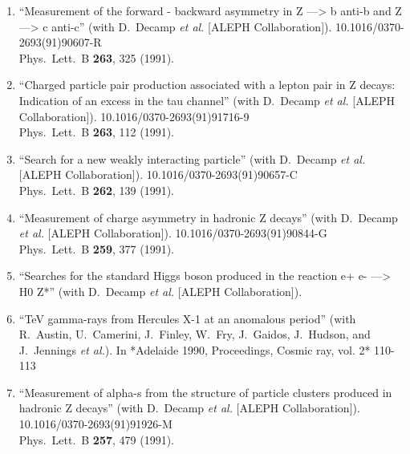 \begin{enumerate}
\item ``Measurement of the forward - backward asymmetry in Z ---> b anti-b and Z ---> c anti-c'' (with D.~Decamp {\it et al.}  [ALEPH Collaboration]). 10.1016/0370-2693(91)90607-R
\\{}Phys.\ Lett.\ B {\bf 263}, 325 (1991). %


\item ``Charged particle pair production associated with a lepton pair in Z decays: Indication of an excess in the tau channel'' (with D.~Decamp {\it et al.}  [ALEPH Collaboration]). 10.1016/0370-2693(91)91716-9
\\{}Phys.\ Lett.\ B {\bf 263}, 112 (1991). %


\item ``Search for a new weakly interacting particle'' (with D.~Decamp {\it et al.}  [ALEPH Collaboration]). 10.1016/0370-2693(91)90657-C
\\{}Phys.\ Lett.\ B {\bf 262}, 139 (1991). %


\item ``Measurement of charge asymmetry in hadronic Z decays'' (with D.~Decamp {\it et al.}  [ALEPH Collaboration]). 10.1016/0370-2693(91)90844-G
\\{}Phys.\ Lett.\ B {\bf 259}, 377 (1991). %


\item ``Searches for the standard Higgs boson produced in the reaction e+ e- ---> H0 Z*'' (with D.~Decamp {\it et al.}  [ALEPH Collaboration]).
  


\item ``TeV gamma-rays from Hercules X-1 at an anomalous period'' (with R.~Austin, U.~Camerini, J.~Finley, W.~Fry, J.~Gaidos, J.~Hudson, and J.~Jennings {\it et al.}). In *Adelaide 1990, Proceedings, Cosmic ray, vol. 2* 110-113 %


\item ``Measurement of alpha-s from the structure of particle clusters produced in hadronic Z decays'' (with D.~Decamp {\it et al.}  [ALEPH Collaboration]). 10.1016/0370-2693(91)91926-M
\\{}Phys.\ Lett.\ B {\bf 257}, 479 (1991). %



\end{enumerate}
